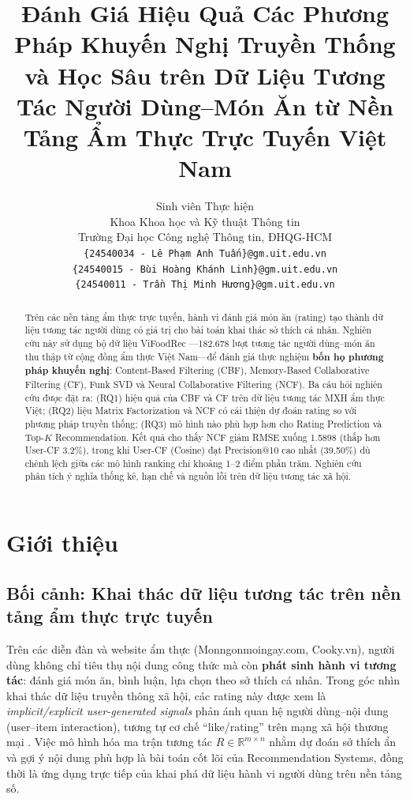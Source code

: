 \documentclass[11pt]{article}
\title{Đánh Giá Hiệu Quả Các Phương Pháp Khuyến Nghị Truyền Thống và Học Sâu trên Dữ Liệu Tương Tác Người Dùng--Món Ăn từ Nền Tảng Ẩm Thực Trực Tuyến Việt Nam}
\author{
  Sinh viên Thực hiện \\
  Khoa Khoa học và Kỹ thuật Thông tin \\
  Trường Đại học Công nghệ Thông tin, ĐHQG-HCM \\
  \texttt{\{24540034 - Lê Phạm Anh Tuấn\}@gm.uit.edu.vn}\\
  \texttt{\{24540015 - Bùi Hoàng Khánh Linh\}@gm.uit.edu.vn}\\
  \texttt{\{24540011 - Trần Thị Minh Hương\}@gm.uit.edu.vn}\\
}
\date{}
\begin{document}
\maketitle

\begin{abstract}
Trên các nền tảng ẩm thực trực tuyến, hành vi đánh giá món ăn (rating) tạo thành dữ liệu tương tác người dùng có giá trị cho bài toán khai thác sở thích cá nhân. Nghiên cứu này sử dụng bộ dữ liệu ViFoodRec \cite{tran2024vifoodrec}---182.678 lượt tương tác người dùng--món ăn thu thập từ cộng đồng ẩm thực Việt Nam---để đánh giá thực nghiệm \textbf{bốn họ phương pháp khuyến nghị}: Content-Based Filtering (CBF), Memory-Based Collaborative Filtering (CF), Funk SVD và Neural Collaborative Filtering (NCF). Ba câu hỏi nghiên cứu được đặt ra: (RQ1) hiệu quả của CBF và CF trên dữ liệu tương tác MXH ẩm thực Việt; (RQ2) liệu Matrix Factorization và NCF có cải thiện dự đoán rating so với phương pháp truyền thống; (RQ3) mô hình nào phù hợp hơn cho Rating Prediction và Top-$K$ Recommendation. Kết quả cho thấy NCF giảm RMSE xuống 1.5898 (thấp hơn User-CF 3.2\%), trong khi User-CF (Cosine) đạt Precision@10 cao nhất (39.50\%) dù chênh lệch giữa các mô hình ranking chỉ khoảng 1--2 điểm phần trăm. Nghiên cứu phân tích ý nghĩa thống kê, hạn chế và nguồn lỗi trên dữ liệu tương tác xã hội.
\end{abstract}

\section{Giới thiệu}
\label{sec:intro}

\subsection{Bối cảnh: Khai thác dữ liệu tương tác trên nền tảng ẩm thực trực tuyến}
Trên các diễn đàn và website ẩm thực (Monngonmoingay.com, Cooky.vn), người dùng không chỉ tiêu thụ nội dung công thức mà còn \textbf{phát sinh hành vi tương tác}: đánh giá món ăn, bình luận, lựa chọn theo sở thích cá nhân. Trong góc nhìn khai thác dữ liệu truyền thông xã hội, các rating này được xem là \textit{implicit/explicit user-generated signals} phản ánh quan hệ người dùng--nội dung (user--item interaction), tương tự cơ chế ``like/rating'' trên mạng xã hội thương mại \cite{adomavicius2005toward}. Việc mô hình hóa ma trận tương tác $R \in \mathbb{R}^{m \times n}$ nhằm dự đoán sở thích ẩn và gợi ý nội dung phù hợp là bài toán cốt lõi của Recommendation Systems, đồng thời là ứng dụng trực tiếp của khai phá dữ liệu hành vi người dùng trên nền tảng số.
\end{document}
